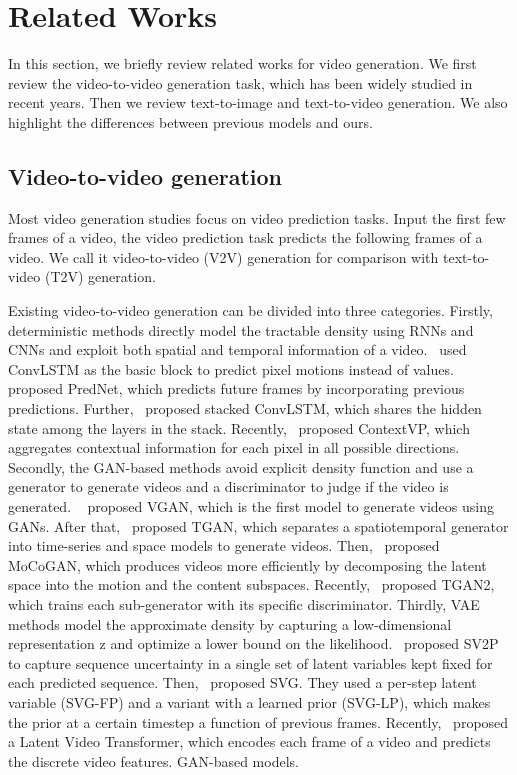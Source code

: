 \documentclass{article}
\begin{document}
\section{Related Works}

In this section, we briefly review related works for video generation. We first review the video-to-video generation task, which has been widely studied in recent years. Then we review text-to-image and text-to-video generation. We also highlight the differences between previous models and ours.

\subsection{Video-to-video generation}

Most video generation studies focus on video prediction tasks. Input the first few frames of a video, the video prediction task predicts the following frames of a video. We call it video-to-video (V2V) generation for comparison with text-to-video (T2V) generation. 

Existing video-to-video generation can be divided into three categories. Firstly, deterministic methods directly model the tractable density using RNNs and CNNs and exploit both spatial and temporal information of a video.~\cite{finnUnsupervisedLearningPhysical2016} used ConvLSTM as the basic block to predict pixel motions instead of values.~\cite{lotterDeepPredictiveCoding2017} proposed PredNet, which predicts future frames by incorporating previous predictions. Further,~\cite{wangPredRNNRecurrentNeural2017} proposed stacked ConvLSTM, which shares the hidden state among the layers in the stack. Recently,~\cite{byeonContextvpFullyContextaware2018} proposed ContextVP, which aggregates contextual information for each pixel in all possible directions. Secondly, the GAN-based methods avoid explicit density function and use a generator to generate videos and a discriminator to judge if the video is generated. ~\cite{vondrickGeneratingVideosScene2016} proposed VGAN, which is the first model to generate videos using GANs. After that,~\cite{saitoTemporalGenerativeAdversarial2017} proposed TGAN, which separates a spatiotemporal generator into time-series and space models to generate videos. Then,~\cite{tulyakovMocoganDecomposingMotion2018} proposed MoCoGAN, which produces videos more efficiently by decomposing the latent space into the motion and the content subspaces. Recently,~\cite{saitoTrainSparselyGenerate2020a} proposed TGAN2, which trains each sub-generator with its specific discriminator.  Thirdly, VAE methods model the approximate density by capturing a low-dimensional representation z and optimize a lower bound on the likelihood.~\cite{babaeizadehStochasticVariationalVideo2017} proposed SV2P to capture sequence uncertainty in a single set of latent variables kept fixed for each predicted sequence. Then,~\cite{dentonStochasticVideoGeneration2018} proposed SVG. They used a per-step latent variable (SVG-FP) and a variant with a learned prior (SVG-LP), which makes the prior at a certain timestep a function of previous frames. Recently,~\cite{rakhimovLatentVideoTransformer2020} proposed a Latent Video Transformer, which encodes each frame of a video and predicts the discrete video features. GAN-based models. 
\end{document}
